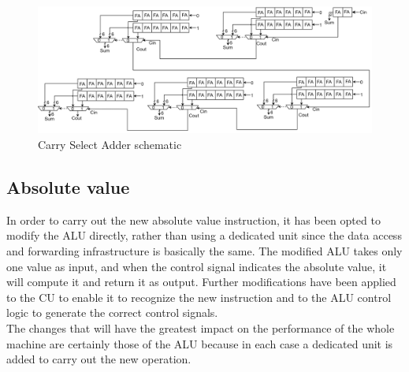 \begin{figure}[htbp]
	\centering
	\includegraphics[width=1\textwidth]{sec2/images/CSA_full2.png }
	\caption{Carry Select Adder schematic}
	\label{fig:CSA_full}
\end{figure}

\subsection{Absolute value}
In order to carry out the new absolute value instruction, it has been opted to modify the ALU directly, rather than using a dedicated unit since the data access and forwarding infrastructure is basically the same. The modified ALU takes only one value as input, and when the control signal indicates the absolute value, it will compute it and return it as output. Further modifications have been applied to the CU to enable it to recognize the new instruction and to the ALU control logic to generate the correct control signals.\\
The changes that will have the greatest impact on the performance of the whole machine are certainly those of the ALU because in each case a dedicated unit is added to carry out the new operation.

